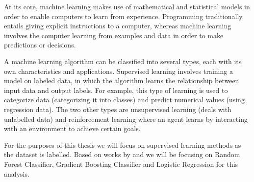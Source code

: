 At its core, machine learning makes use of mathematical and statistical models in order to enable computers to learn from experience. Programming traditionally entails giving explicit instructions to a computer, whereas machine learning involves the computer learning from examples and data in order to make predictions or decisions.

A machine learning algorithm can be classified into several types, each with its own characteristics and applications. Supervised learning involves training a model on labeled data, in which the algorithm learns the relationship between input data and output labels. For example, this type of learning is used to categorize data (categorizing it into classes) and predict numerical values (using regression data). The two other types are unsupervised learning (deals with unlabelled data) and reinforcement learning where an agent learns by interacting with an environment to achieve certain goals.

For the purposes of this thesis we will focus on supervised learning methods as the dataset is labelled. Based on works by \cite{Wierzbiński} and \cite{Clarke2020} we will be focusing on Random Forest Classifier, Gradient Boosting Classifier and Logistic Regression for this analysis.





